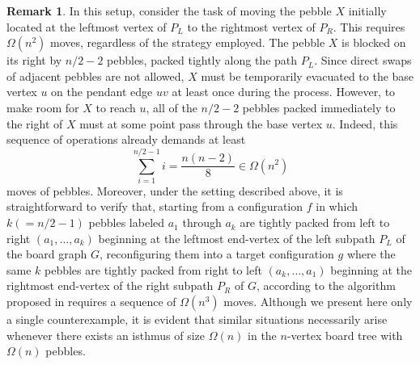 \documentclass[letter,11pt]{article}
\theoremstyle{definition}
\newtheorem{rem}{Remark}
\theoremstyle{definition}
\newcommand{\1}{\boldmath$~1~$\unboldmath}
\newcommand{\Ord}{\mathrm{O}}
\begin{document}
\begin{rem}
In this setup, consider the task of moving the pebble $X$ initially located at the leftmost vertex of $P_L$ to the rightmost vertex of $P_R$.
This requires $\Omega(n^2)$ moves, regardless of the strategy employed.
The pebble $X$ is blocked on its right by $n/2 - 2$ pebbles, packed tightly along the path $P_L$.
Since direct swaps of adjacent pebbles are not allowed, $X$ must be temporarily evacuated to the base vertex $u$ on the pendant edge $uv$ at least once during the process.
However, to make room for $X$ to reach $u$, all of the $n/2 - 2$ pebbles packed immediately to the right of $X$ must at some point pass through the base vertex $u$.
Indeed, this sequence of operations already demands at least 
$$
\sum_{i=1}^{n/2 - 1} i = \frac{n(n-2)}{8} \in \Omega(n^2)
$$
moves of pebbles. 
Moreover, under the setting described above, it is straightforward to verify that, starting from a configuration $f$ in which $k(=n/2 - 1)$ pebbles
labeled $a_1$ through $a_k$ are tightly packed from left to right $(a_1,\ldots, a_k)$ beginning at the leftmost end-vertex of the left subpath $P_L$
of the board graph $G$, reconfiguring them into a target configuration $g$ where the same $k$ pebbles are tightly packed from right to left
$(a_k,\ldots,a_1)$ beginning at the rightmost end-vertex of the right subpath $P_R$ of $G$, according to the algorithm proposed in \cite{715921}
requires a sequence of $\Omega(n^3)$ moves.
Although we present here only a single counterexample, %
it is evident that similar situations necessarily arise whenever there exists an isthmus of size $\Omega(n)$
in the $n$-vertex board tree with $\Omega(n)$ pebbles. 

\end{rem}
\end{document}
